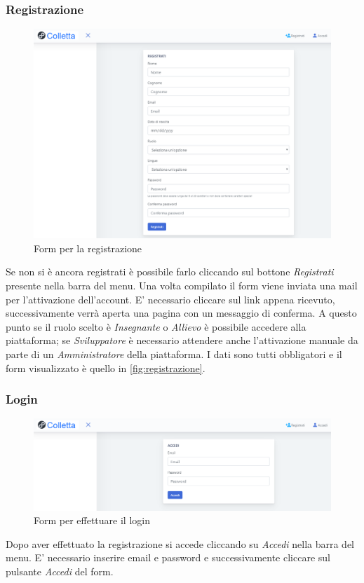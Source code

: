     \subsubsection{Registrazione}
    	\begin{figure}[H]
        	\centering
        	\includegraphics[width=1\linewidth]{sez/img/autenticazione/formRegistrazione.PNG} 
        	\caption{Form per la registrazione}\label{fig:registrazione}
    	\end{figure}
	   Se non si è ancora registrati è possibile farlo cliccando sul bottone \textit{Registrati} presente nella barra del menu. Una volta compilato il form viene inviata una mail per l'attivazione dell'account. E' necessario cliccare sul link appena ricevuto, successivamente verrà aperta una pagina con un messaggio di conferma. A questo punto se il ruolo scelto è \textit{Insegnante} o \textit{Allievo} è possibile accedere alla piattaforma; se \textit{Sviluppatore} è necessario attendere anche l'attivazione manuale da parte di un  \textit{Amministratore} della piattaforma. I dati sono tutti obbligatori e il form visualizzato è quello in \autoref{fig:registrazione}.
    \subsubsection{Login}
    	\begin{figure}[H]
        	\centering
        	\includegraphics[width=1\linewidth]{sez/img/autenticazione/formAccedi.PNG} 
        	\caption{Form per effettuare il login}\label{fig:1}
    	\end{figure}
 	  Dopo aver effettuato la registrazione si accede cliccando su \textit{Accedi} nella barra del menu. E' necessario inserire email e password e successivamente cliccare sul pulsante \textit{Accedi} del form.



